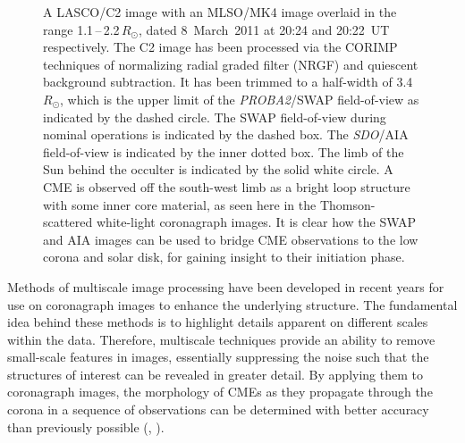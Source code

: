 \documentclass[namedreferences]{solarphysics}
\begin{document}
\begin{article}
\begin{figure}[ht]
\caption{A LASCO/C2 image with an MLSO/MK4 image overlaid in the range 1.1\,--\,2.2\,$R_\odot$, dated 8~March~2011 at 20:24 and 20:22~UT respectively. The C2 image has been processed via the CORIMP techniques of normalizing radial graded filter (NRGF) and quiescent background subtraction. It has been trimmed to a half-width of 3.4\,$R_\odot$, which is the upper limit of the \emph{PROBA2}/SWAP field-of-view as indicated by the dashed circle. The SWAP field-of-view during nominal operations is indicated by the dashed box. The \emph{SDO}/AIA field-of-view is indicated by the inner dotted box. The limb of the Sun behind the occulter is indicated by the solid white circle. A CME is observed off the south-west limb as a bright loop structure with some inner core material, as seen here in the Thomson-scattered white-light coronagraph images. It is clear how the SWAP and AIA images can be used to bridge CME observations to the low corona and solar disk, for gaining insight to their initiation phase.}
\label{overlays}
\end{figure}

Methods of multiscale image processing have been developed in recent years for use on coronagraph images to enhance the underlying structure. The fundamental idea behind these methods is to highlight details apparent on different scales within the data. Therefore, multiscale techniques provide an ability to remove small-scale features in images, essentially suppressing the noise such that the structures of interest can be revealed in greater detail. By applying them to coronagraph images, the morphology of CMEs as they propagate through the corona in a sequence of observations can be determined with better accuracy than previously possible (, \citeyear{2012ApJ...752..145B}). %


\end{article}
\end{document}
